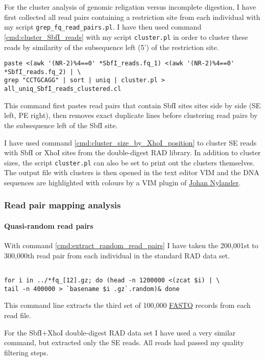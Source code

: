 \documentclass[a4paper,12pt,times,authoryear,twoside,print,index]{Classes/PhDThesisPSnPDF}\usepackage[]{graphicx}\usepackage[]{color}
\begin{document}
For the cluster analysis of genomic religation versus incomplete digestion, I have first collected all read pairs containing a restriction site from each individual with my script \texttt{grep\_fq\_read\_pairs.pl}. I have then used command \ref{cmd:cluster_SbfI_reads} with my script \texttt{cluster.pl} in order to cluster these reads by similarity of the subsequence left (5') of the restriction site. 
%
\begin{cmd}
\captionsetup{type=cmd}
\begin{Verbatim}[fontsize=\scriptsize, formatcom=\color{darkgray}]
paste <(awk '(NR-2)%4==0' *SbfI_reads.fq_1) <(awk '(NR-2)%4==0' *SbfI_reads.fq_2) | \
grep "CCTGCAGG" | sort | uniq | cluster.pl > all_uniq_SbfI_reads_clustered.cl
\end{Verbatim}
\caption{\small This command first pastes read pairs that contain SbfI sites sites side by side (SE left, PE right), then removes exact duplicate lines before clustering read pairs by the subsequence left of the SbfI site.}
\label{cmd:cluster_SbfI_reads}
\end{cmd}
%
I have used command \ref{cmd:cluster_size_by_XhoI_position} to cluster SE reads with SbfI or XhoI sites from the double-digest RAD library. In addition to cluster sizes, the script \texttt{cluster.pl} can also be set to print out the clusters themselves. The output file with clusters is then opened in the text editor VIM and the DNA sequences are highlighted with colours by a VIM plugin of \href{https://www.abc.se/~nylander/}{Johan Nylander}.

\FloatBarrier
\subsubsection{Read pair mapping analysis}\label{read_pair_mapping_analysis}

\paragraph{Quasi-random read pairs} 
With command \ref{cmd:extract_random_read_pairs} I have taken the 200,001st to 300,000th read pair from each individual in the standard RAD data set.
%
\begin{cmd}
\captionsetup{type=cmd}
\begin{Verbatim}[fontsize=\scriptsize, formatcom=\color{darkgray}]

for i in ../*fq_[12].gz; do (head -n 1200000 <(zcat $i) | \
tail -n 400000 > `basename $i .gz`.random)& done
\end{Verbatim}
\caption{\small This command line extracts the third set of 100,000 \href{http://en.wikipedia.org/wiki/FASTQ_format}{FASTQ} records from each read file.}
\label{cmd:extract_random_read_pairs}
\end{cmd}
%
For the SbfI$+$XhoI double-digest RAD data set I have used a very similar command, but extracted only the SE reads. All reads had passed my quality filtering steps.
\end{document}
